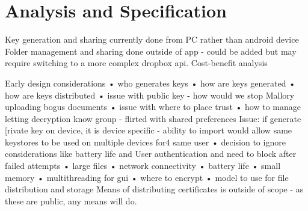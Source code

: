 
\chapter{Analysis and Specification}
\label{cha:asis-spec}

Key generation and sharing currently done from PC rather than android device 
Folder management and sharing done outside of app - could be added but may require switching to a more complex dropbox api.  Cost-benefit analysis

Early design considerations 
• who generates keys
• how are keys generated
• how are keys distributed
• issue with public key - how would we stop Mallory uploading bogus documents
• issue with where to place trust
• how to manage letting decryption know group - flirted with shared preferences
Issue: if generate [rivate key on device, it is device specific - ability to import would allow same keystores to be used on multiple devices for4 same user
• decision to ignore considerations like battery life and 
User authentication and need to block after failed attempts
• large files
• network connectivity
• battery life
• small memory
• multithreading for gui
• where to encrypt
• model to use for file distribution and storage
Means of distributing certificates is outside of scope - as these are public, any means will do.
